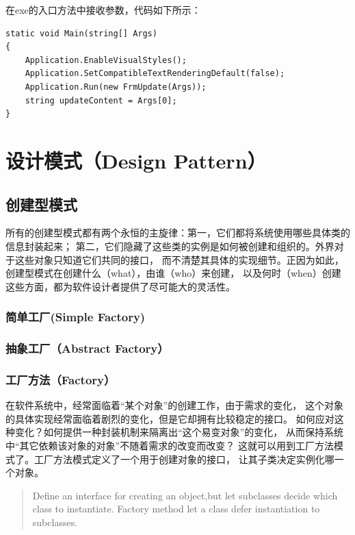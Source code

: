 \documentclass{book}
\begin{document}
在exe的入口方法中接收参数，代码如下所示：
\begin{lstlisting}[language={[Sharp]C}]
static void Main(string[] Args)
{	  
    Application.EnableVisualStyles();
    Application.SetCompatibleTextRenderingDefault(false);
    Application.Run(new FrmUpdate(Args)); 
    string updateContent = Args[0]; 
}
\end{lstlisting}

\section{设计模式（Design Pattern）}

\subsection{创建型模式}

所有的创建型模式都有两个永恒的主旋律：第一，它们都将系统使用哪些具体类的信息封装起来；
第二，它们隐藏了这些类的实例是如何被创建和组织的。外界对于这些对象只知道它们共同的接口，
而不清楚其具体的实现细节。正因为如此，创建型模式在创建什么（what），由谁（who）来创建，
以及何时（when）创建这些方面，都为软件设计者提供了尽可能大的灵活性。
	
\subsubsection{简单工厂(Simple Factory)}

\subsubsection{抽象工厂（Abstract Factory）}

\subsubsection{工厂方法（Factory）}

在软件系统中，经常面临着“某个对象”的创建工作，由于需求的变化，
这个对象的具体实现经常面临着剧烈的变化，但是它却拥有比较稳定的接口。
如何应对这种变化？如何提供一种封装机制来隔离出“这个易变对象”的变化，
从而保持系统中“其它依赖该对象的对象”不随着需求的改变而改变？
这就可以用到工厂方法模式了。工厂方法模式定义了一个用于创建对象的接口，
让其子类决定实例化哪一个对象。

\begin{quotation}
Define an interface for creating an object,but let subclasses decide which class to instantiate.
Factory method let a class defer instantiation to subclasses.
\end{quotation}
\end{document}
